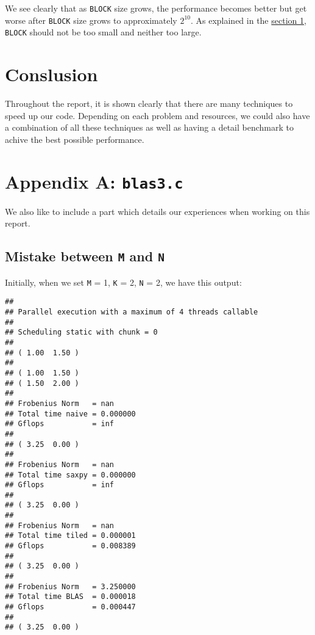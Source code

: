 \documentclass[
  12pt,
  xcolor = usenames,dvipsnames]{article}
\newcommand{\passthrough}[1]{#1}
\begin{document}
We see clearly that as \passthrough{\lstinline!BLOCK!} size grows, the performance becomes better but get worse after \passthrough{\lstinline!BLOCK!} size grows to approximately \(2^10\). As explained in the \protect\hyperlink{cache-blocking}{section 1}, \passthrough{\lstinline!BLOCK!} should not be too small and neither too large.

\hypertarget{conslusion}{%
\section{Conslusion}\label{conslusion}}

Throughout the report, it is shown clearly that there are many techniques to speed up our code. Depending on each problem and resources, we could also have a combination of all these techniques as well as having a detail benchmark to achive the best possible performance.

\newpage

\hypertarget{appendix-a-blas3.c}{%
\section*{\texorpdfstring{Appendix A: \texttt{blas3.c}}{Appendix A: blas3.c}}\label{appendix-a-blas3.c}}

We also like to include a part which details our experiences when working on this report.

\hypertarget{mistake-between-m-and-n}{%
\subsection*{\texorpdfstring{Mistake between \texttt{M} and \texttt{N}}{Mistake between M and N}}\label{mistake-between-m-and-n}}

Initially, when we set \passthrough{\lstinline!M!} = 1, \passthrough{\lstinline!K!} = 2, \passthrough{\lstinline!N!} = 2, we have this output:

\begin{lstlisting}
## 
## Parallel execution with a maximum of 4 threads callable
## 
## Scheduling static with chunk = 0
## 
## ( 1.00  1.50 )
## 
## ( 1.00  1.50 )
## ( 1.50  2.00 )
## 
## Frobenius Norm   = nan
## Total time naive = 0.000000
## Gflops           = inf
## 
## ( 3.25  0.00 )
## 
## Frobenius Norm   = nan
## Total time saxpy = 0.000000
## Gflops           = inf
## 
## ( 3.25  0.00 )
## 
## Frobenius Norm   = nan
## Total time tiled = 0.000001
## Gflops           = 0.008389
## 
## ( 3.25  0.00 )
## 
## Frobenius Norm   = 3.250000
## Total time BLAS  = 0.000018
## Gflops           = 0.000447
## 
## ( 3.25  0.00 )
\end{lstlisting}
\end{document}
